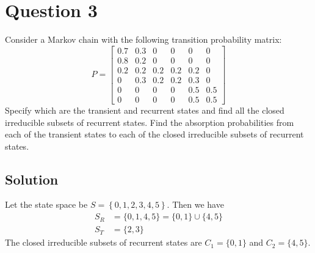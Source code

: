 \section*{Question 3}

Consider a Markov chain with the following transition probability matrix:
\[
    P=
    \begin{bmatrix}
        0.7 & 0.3 & 0   & 0   & 0   & 0   \\
        0.8 & 0.2 & 0   & 0   & 0   & 0   \\
        0.2 & 0.2 & 0.2 & 0.2 & 0.2 & 0   \\
        0   & 0.3 & 0.2 & 0.2 & 0.3 & 0   \\
        0   & 0   & 0   & 0   & 0.5 & 0.5 \\
        0   & 0   & 0   & 0   & 0.5 & 0.5
    \end{bmatrix}
\]
Specify which are the transient and recurrent states and find all the closed irreducible subsets of recurrent states.
Find the absorption probabilities from each of the transient states to each of the closed irreducible subsets of recurrent states.

\subsection*{Solution}

Let the state space be \( S=\left \{ 0, 1, 2, 3, 4, 5 \right \} \).
Then we have
\begin{align*}
    S_R
     & =
    \{ 0, 1, 4, 5 \}
    =
    \{ 0, 1 \} \cup \{ 4, 5 \}
    \\
    S_T
     & =
    \{ 2, 3 \}
\end{align*}
The closed irreducible subsets of recurrent states are \( C_1 = \{ 0, 1 \} \) and \( C_2 = \{ 4, 5 \} \).


